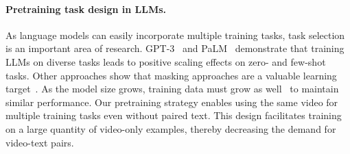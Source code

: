 





\vspace{-4mm}
\paragraph{Pretraining task design in LLMs.}

As language models can easily incorporate multiple training tasks, task selection is an important area of research. 
%
GPT-3~\cite{brown2020language} and PaLM~\cite{chowdhery2022palm} demonstrate that training LLMs on diverse tasks leads to positive scaling effects on zero- and few-shot tasks.
%
Other approaches show that masking approaches are a valuable learning target~\cite{hoffmann2022training,yu2023magvit,yu2023language}. 
%
As the model size grows, training data must grow as well~\cite{hoffmann2022training} to maintain similar performance. 
%
Our pretraining strategy enables using the same video for multiple training tasks even without paired text. 
%
This design facilitates training on a large quantity of video-only examples, thereby decreasing the demand for video-text pairs.
